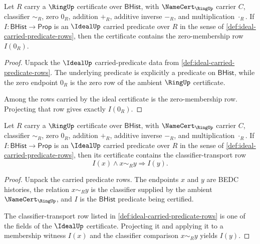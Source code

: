 

\begin{theorem}
\label{thm:ideal-zero-membership-obligation}
Let $R$ carry a $\RingUp$ certificate over $\mathsf{BHist}$, with $\NameCert_{\RingUp}$ carrier $C$, classifier $\sim_R$, zero $0_R$, addition $+_R$, additive inverse $-_R$, and multiplication $\cdot_R$. If $I:\mathsf{BHist}\to\mathsf{Prop}$ is an $\IdealUp$ carried predicate over $R$ in the sense of \autoref{def:ideal-carried-predicate-rows}, then the certificate contains the zero-membership row $I(0_R)$.
\end{theorem}
\begin{proof}
Unpack the $\IdealUp$ carried-predicate data from \autoref{def:ideal-carried-predicate-rows}. The underlying predicate is explicitly a predicate on $\mathsf{BHist}$, while the zero endpoint $0_R$ is the zero row of the ambient $\RingUp$ certificate.

Among the rows carried by the ideal certificate is the zero-membership row. Projecting that row gives exactly $I(0_R)$.
\end{proof}

\begin{theorem}
\label{thm:ideal-classifier-transport-obligation}
Let $R$ carry a $\RingUp$ certificate over $\mathsf{BHist}$, with $\NameCert_{\RingUp}$ carrier $C$, classifier $\sim_R$, zero $0_R$, addition $+_R$, additive inverse $-_R$, and multiplication $\cdot_R$. If $I:\mathsf{BHist}\to\mathsf{Prop}$ is an $\IdealUp$ carried predicate over $R$ in the sense of \autoref{def:ideal-carried-predicate-rows}, then its certificate contains the classifier-transport row
$$
I(x)\land x\sim_R y\Longrightarrow I(y).
$$
\end{theorem}
\begin{proof}
Unpack the carried predicate rows. The endpoints $x$ and $y$ are BEDC histories, the relation $x\sim_R y$ is the classifier supplied by the ambient $\NameCert_{\RingUp}$, and $I$ is the $\mathsf{BHist}$ predicate being certified.

The classifier-transport row listed in \autoref{def:ideal-carried-predicate-rows} is one of the fields of the $\IdealUp$ certificate. Projecting it and applying it to a membership witness $I(x)$ and the classifier comparison $x\sim_R y$ yields $I(y)$.
\end{proof}


